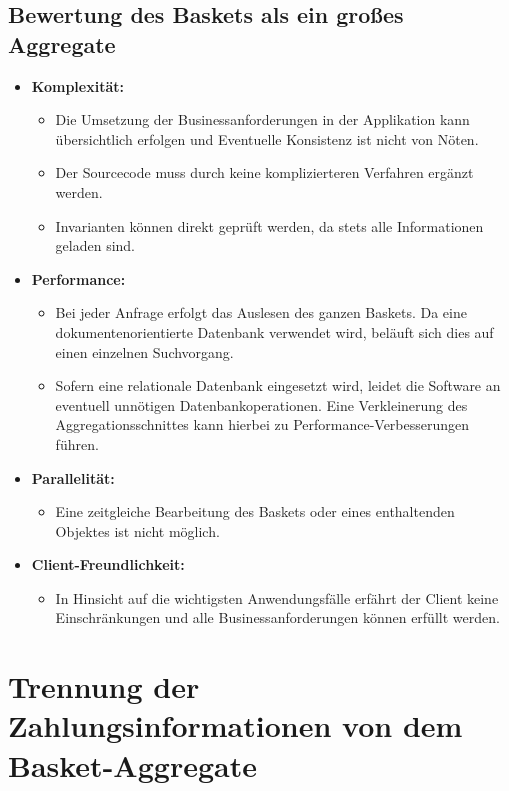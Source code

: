 \pagebreak

\subsection{Bewertung des Baskets als ein großes Aggregate}

\begin{itemize}[noitemsep,nolistsep,topsep=-2pt]
	\item \textbf{Komplexität: } {
		\begin{itemize}
			\item {Die Umsetzung der Businessanforderungen in der Applikation kann übersichtlich erfolgen und Eventuelle Konsistenz ist nicht von Nöten. }
			\item {Der Sourcecode muss durch keine komplizierteren Verfahren ergänzt werden.}
			\item {Invarianten können direkt geprüft werden, da stets alle Informationen geladen sind. }
		\end{itemize}
	}
	\item \textbf{Performance: } {
		\begin{itemize}
			\item Bei jeder Anfrage erfolgt das Auslesen des ganzen Baskets. Da eine dokumentenorientierte Datenbank verwendet wird, beläuft sich dies auf einen einzelnen Suchvorgang.
			\item Sofern eine relationale Datenbank eingesetzt wird, leidet die Software an eventuell unnötigen Datenbankoperationen. Eine Verkleinerung des Aggregationsschnittes kann hierbei zu Performance-Verbesserungen führen.
		\end{itemize}
	}
	\item \textbf{Parallelität: } {
		\begin{itemize}
			\item Eine zeitgleiche Bearbeitung des Baskets oder eines enthaltenden Objektes ist nicht möglich.
		\end{itemize}	
	}
	\item \textbf{Client-Freundlichkeit: } {
		\begin{itemize}
			\item In Hinsicht auf die wichtigsten Anwendungsfälle erfährt der Client keine Einschränkungen und alle Businessanforderungen können erfüllt werden.
		\end{itemize}
	}
\end{itemize}


\section{Trennung der Zahlungsinformationen von dem Basket-Aggregate}

